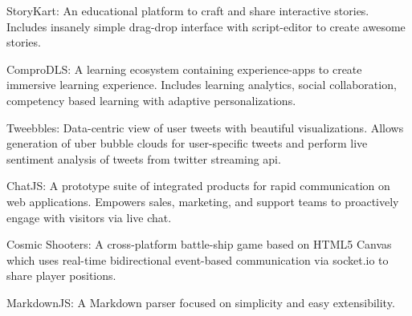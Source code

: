 

\begin{cventries}
	\cvprojects
	{\begin{cvitems} %
			\item {StoryKart: An educational platform to craft and share interactive stories. Includes insanely simple drag-drop interface with script-editor to create awesome stories.}
			\item {ComproDLS: A learning ecosystem containing experience-apps to create immersive learning experience. Includes learning analytics, social collaboration, competency based learning with adaptive personalizations.}
			\item {Tweebbles: Data-centric view of user tweets with beautiful visualizations. Allows generation of uber bubble clouds for user-specific tweets and perform live sentiment analysis of tweets from twitter streaming api.}
			\item {ChatJS: A prototype suite of integrated products for rapid communication on web applications. Empowers sales, marketing, and support teams to proactively engage with visitors via live chat.}
			\item {Cosmic Shooters: A cross-platform battle-ship game based on HTML5 Canvas which uses real-time bidirectional event-based communication via socket.io to share player positions.}
			\item {MarkdownJS: A Markdown parser focused on simplicity and easy extensibility.}
	\end{cvitems}
}
\end{cventries}

